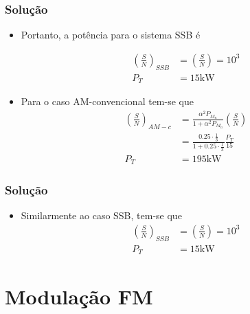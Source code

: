 \documentclass{beamer}
\begin{document}
\begin{frame}
  \frametitle{Solução}

  \begin{itemize}

    \item Portanto, a potência para o sistema SSB é

  \begin{align*}
    \left(\frac{S}{N}\right)_{SSB}  &= \left(\frac{S}{N}\right) = 10^3 \\
    P_T &= 15 \si{\kilo\watt}
  \end{align*}

  
    \item Para o caso AM-convencional tem-se que 
    \begin{align*}
      \left(\frac{S}{N}\right)_{AM-c} &= \frac{\alpha ^2 P_{M_n}}{1+\alpha ^2 P_{M_n}}\left(\frac{S}{N}\right) \\
      &=\frac{0.25 \cdot \frac{1}{3}}{1 + 0.25 \cdot \frac{1}{3}} \frac{P_T}{15} \\
      P_T& =195 \si{\kilo\watt}
    \end{align*}
  \end{itemize}
 
\end{frame}


\begin{frame}
  \frametitle{Solução}

  \begin{itemize}
    \item Similarmente ao caso SSB, tem-se que 
    \begin{align*}
      \left(\frac{S}{N}\right)_{SSB}  &= \left(\frac{S}{N}\right) = 10^3 \\
      P_T &= 15\si{\kilo\watt}
    \end{align*} 
  \end{itemize}  

\end{frame}




\section{Modulação FM}
\end{document}
